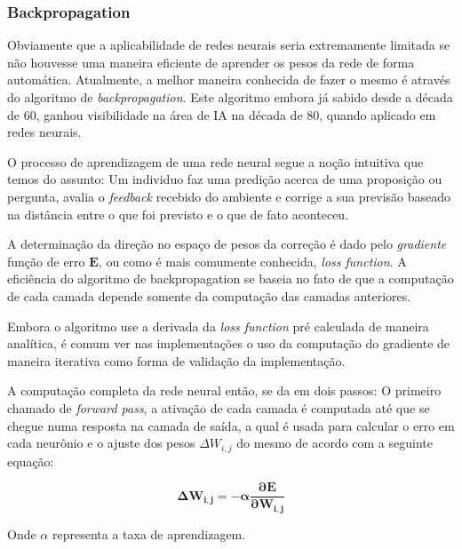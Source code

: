 \subsubsection{Backpropagation}

Obviamente que a aplicabilidade de redes neurais seria extremamente limitada se
não houvesse uma maneira eficiente de aprender os pesos da rede de forma
automática.  Atualmente, a melhor maneira conhecida de fazer o mesmo é através
do algoritmo de \emph{backpropagation}. Este algoritmo embora já sabido desde a
década de 60, ganhou visibilidade na área de IA na década de 80, quando
aplicado em redes neurais.\citep{russell1995modern}

O processo de aprendizagem de uma rede neural segue a noção intuitiva que temos
do assunto: Um individuo faz uma predição acerca de uma proposição ou pergunta,
avalia o \emph{feedback} recebido do ambiente e corrige a sua previsão baseado
na distância entre o que foi previsto e o que de fato aconteceu.

A determinação da direção no espaço de pesos da correção é dado pelo
\emph{gradiente} função de erro $\mathbf{E}$, ou como é mais comumente
conhecida, \emph{loss function}. A eficiência do algoritmo de backpropagation
se baseia no fato de que a computação de cada camada depende somente da
computação das camadas anteriores.

Embora o algoritmo use a derivada da \emph{loss function} pré calculada de
maneira analítica, é comum ver nas implementações o uso da computação do
gradiente de maneira iterativa como forma de validação da implementação.

A computação completa da rede neural então, se da em dois passos: O primeiro
chamado de \emph{forward pass}, a ativação de cada camada é computada até que
se chegue numa resposta na camada de saída, a qual é usada para calcular o erro
em cada neurônio e o ajuste dos pesos $\Delta W_{i,j}$ do mesmo de acordo com a
seguinte equação:

$$ \mathbf{\Delta W_{i,j} = -\alpha\frac{\partial E}{\partial W_{i,j}}} $$

Onde $\alpha$ representa a taxa de aprendizagem.
